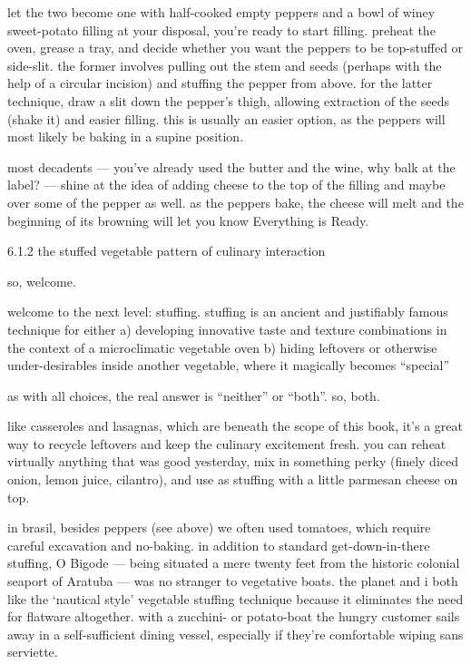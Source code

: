 	let the two become one
with half-cooked empty peppers and a bowl of winey sweet-potato filling at your disposal, you're ready to start filling. preheat the oven, grease a tray, and decide whether you want the peppers to be top-stuffed or side-slit. the former involves pulling out the stem and seeds (perhaps with the help of a circular incision) and stuffing the pepper from above. for the latter technique, draw a slit down the pepper's thigh, allowing extraction of the seeds (shake it) and easier filling. this is usually an easier option, as the peppers will most likely be baking in a supine position.

most decadents --- you've already used the butter and the wine, why balk at the label? --- shine at the idea of adding cheese to the top of the filling and maybe over some of the pepper as well. as the peppers bake, the cheese will melt and the beginning of its browning will let you know Everything is Ready.

6.1.2  the stuffed vegetable pattern of culinary interaction

so,
	welcome.

welcome to the next level: stuffing. stuffing is an ancient and justifiably famous technique for either
	a) developing innovative taste and texture combinations in the context of a microclimatic vegetable oven
	b) hiding leftovers or otherwise under-desirables inside another vegetable, where it magically becomes ``special''

as with all choices, the real answer is ``neither'' or ``both''. so, both.

like casseroles and lasagnas, which are beneath the scope of this book, it's a great way to recycle leftovers and keep the culinary excitement fresh. you can reheat virtually anything that was good yesterday, mix in something perky (finely diced onion, lemon juice, cilantro), and use as stuffing with a little parmesan cheese on top.

in brasil, besides peppers (see above) we often used tomatoes, which require careful excavation and no-baking. in addition to standard get-down-in-there stuffing, O Bigode --- being situated a mere twenty feet from the historic colonial seaport of Aratuba --- was no stranger to vegetative boats. the planet and i both like the `nautical style' vegetable stuffing technique because it eliminates the need for flatware altogether. with a zucchini- or potato-boat the hungry customer sails away in a self-sufficient dining vessel, especially if they're comfortable wiping sans serviette.

